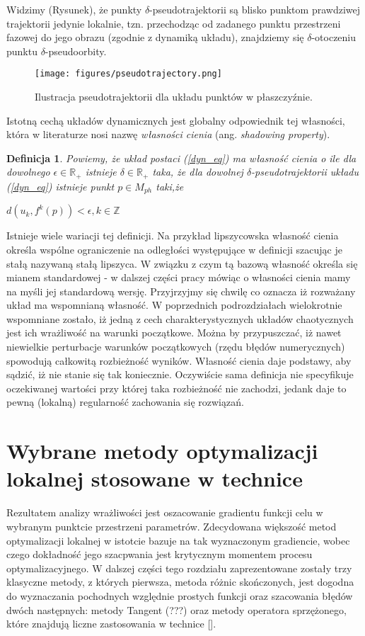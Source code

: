\documentclass[12pt]{article}
\newtheorem{defi}{Definicja}
\begin{document}
Widzimy (Rysunek), że punkty $\delta$-pseudotrajektorii są blisko punktom prawdziwej trajektorii jedynie lokalnie, tzn. przechodząc od zadanego punktu przestrzeni fazowej do jego obrazu (zgodnie z dynamiką układu), znajdziemy się $\delta$-otoczeniu punktu $\delta$-pseudoorbity. 
\begin{figure}[H]
	\texttt{[image: figures/pseudotrajectory.png]} 
	\centering
	\caption{Ilustracja pseudotrajektorii dla układu punktów w płaszczyźnie.}
\end{figure}
Istotną cechą układów dynamicznych jest globalny odpowiednik tej własności, która w literaturze nosi nazwę \textit{własności cienia} (ang. \textit{shadowing property}).
\begin{defi}\label{shadowing_property}
	Powiemy, że układ postaci (\ref{dyn_eq}) ma własność cienia o ile dla dowolnego $ \epsilon \in \mathbb{R}_{+} $ istnieje $ \delta \in \mathbb{R}_{+} $ taka, że dla dowolnej $\delta$-pseudotrajektorii układu (\ref{dyn_eq}) istnieje punkt $ p \in M_{ph} $ taki,że
	\begin{center}
		$ d(u_{k}, f^{k}(p)) < \epsilon, k \in \mathbb{Z}$
	\end{center}
\end{defi}
Istnieje wiele wariacji tej definicji. Na przykład lipszycowska własność cienia określa wspólne ograniczenie na odległości występujące w definicji szacując je stałą nazywaną stałą lipszyca. W związku z czym tą bazową własność określa się mianem standardowej - w dalszej części pracy mówiąc o własności cienia mamy na myśli jej standardową wersję.\newline
Przyjrzyjmy się chwilę co oznacza iż rozważany układ ma wspomnianą własność. W poprzednich podrozdziałach wielokrotnie wspomniane zostało, iż jedną z cech charakterystycznych układów chaotycznych jest ich wrażliwość na warunki początkowe. Można by przypuszczać, iż nawet niewielkie perturbacje warunków początkowych (rzędu błędów numerycznych) spowodują całkowitą rozbieżność wyników. Własność cienia daje podstawy, aby sądzić, iż nie stanie się tak koniecznie. Oczywiście sama definicja nie specyfikuje oczekiwanej wartości przy której taka rozbieżność nie zachodzi, jedank daje to pewną (lokalną) regularność zachowania się rozwiązań.
\newpage
\section{Wybrane metody optymalizacji lokalnej stosowane w technice}
Rezultatem analizy wrażliwości jest oszacowanie gradientu funkcji celu w wybranym punktcie przestrzeni parametrów. Zdecydowana większość metod optymalizacji lokalnej w istotcie bazuje na tak wyznaczonym gradiencie, wobec czego dokładność jego szacpwania jest krytycznym momentem procesu optymalizacyjnego. W dalszej części tego rozdziału zaprezentowane zostały trzy klasyczne metody, z których pierwsza, metoda różnic skończonych, jest dogodna do wyznaczania pochodnych względnie prostych funkcji oraz szacowania błędów dwóch następnych: metody Tangent (???) oraz metody operatora sprzężonego, które znajdują liczne zastosowania w technice [].
\end{document}
